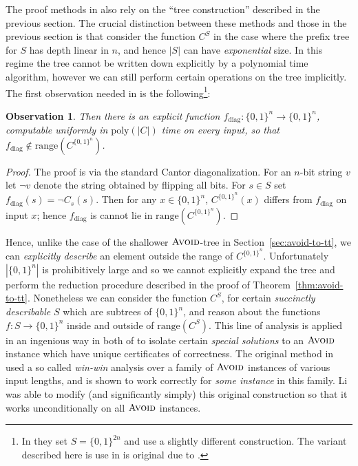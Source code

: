 \documentclass[11pt]{article}
\newtheorem{observation}{Observation}
\newcommand{\B}{\{0,1\}}
\newcommand{\rng}{\mathrm{range}}
\newcommand{\poly}{\mathrm{poly}}
\newcommand{\avoid}{\textsc{Avoid}}
\begin{document}
The proof methods in \cite{Li,CHR} also rely on the ``tree construction'' described in the previous section. The crucial distinction between these methods and those in the previous section is that \cite{Li,CHR} consider the function $C^S$ in the case where the prefix tree for $S$ has depth linear in $n$, and hence $|S|$ can have \emph{exponential} size. In this regime the tree cannot be written down explicitly by a polynomial time algorithm, however we can still perform certain operations on the tree implicitly. The first observation needed in \cite{Li,CHR} is the following\footnote{In \cite{Li,CHR} they set $S= \B^{2n}$ and use a slightly different construction. The variant described here is use in \cite{toni}  is original due to \cite{Paris-Wilkie-Woods}.}:
\begin{observation}
Then there is an explicit function $f_\mathrm{diag}: \B^n \to \B^n$, computable uniformly in $\poly(|C|)$ time on every input, so that $f_\mathrm{diag}\notin \rng(C^{\B^n})$.
\end{observation}
\begin{proof}
The proof is via the standard Cantor diagonalization. For an $n$-bit string $v$ let $\lnot v$ denote the string obtained by flipping all bits. For $s \in S$ set $f_\mathrm{diag}(s) = \lnot C_s(s)$. Then for any $x \in \B^n$, $C^{\B^n}(x)$ differs from $f_\mathrm{diag} $ on input $x$; hence $f_\mathrm{diag} $ is cannot lie in $ \rng(C^{\B^n})$.
\end{proof}
Hence, unlike the case of the shallower $\avoid$-tree in Section~\ref{sec:avoid-to-tt}, we can \emph{explicitly describe} an element outside the range of $C^{\B^n}$. Unfortunately $|\B^n|$ is prohibitively large and so we cannot explicitly expand the tree and perform the reduction procedure described in the proof of Theorem~\ref{thm:avoid-to-tt}. Nonetheless we can consider the function $C^S$, for certain \emph{succinctly describable} $S$ which are subtrees of $\B^n$, and reason about the functions $f: S \to \B^n$ inside and outside of $\mathrm{range}(C^S)$. This line of analysis is applied in an ingenious way in both of \cite{Li,CHR} to isolate certain \emph{special solutions} to an $\avoid$ instance which have unique certificates of correctness. The original method in \cite{CHR} used a so called \emph{win-win} analysis over a family of $\avoid$ instances of various input lengths, and is shown to work correctly for \emph{some instance} in this family. Li was able to modify (and significantly simply) this original construction so that it works unconditionally on all $\avoid$ instances. 
\end{document}
